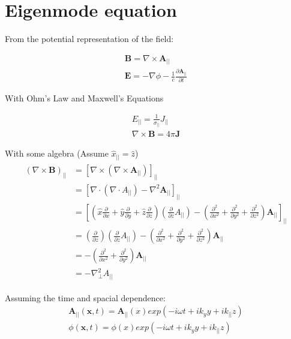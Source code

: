 \section{Eigenmode equation}
From the potential representation of the field:

\begin{equation}
    \begin{aligned}
    \textbf{B}=\nabla \times \textbf{A}_{||}\\
    \textbf{E}=-\nabla \phi -\frac{1}{c}\frac{\partial \textbf{A}_{||}}{\partial t}
    \end{aligned}
\end{equation}

With Ohm's Law and Maxwell's Equations

\begin{eqnarray}
    E_{||}=\frac{1}{\sigma_{||}}J_{||} \label{eq:ohm}\\
    \nabla \times \textbf{B} = 4\pi \textbf{J}
\end{eqnarray}

With some algebra (Assume $\hat{x}_{||}=\hat{z}$)
\begin{eqnarray}
\begin{aligned}
    (\nabla \times \textbf{B})_{||}{}&=[\nabla \times(\nabla \times \textbf{A}_{||}) ]_{||}\\
    &=[\nabla\cdot (\nabla\cdot A_{||}) - \nabla^2\textbf{A}_{||}]_{||}\\
    &=[(\hat{x}\frac{\partial }{\partial x}+
    \hat{y}\frac{\partial }{\partial y}+
    \hat{z}\frac{\partial }{\partial z}) (\frac{\partial }{\partial z} A_{||}) - (\frac{\partial^2 }{\partial x^2}+
    \frac{\partial^2 }{\partial y^2}+
    \frac{\partial^2 }{\partial z^2})\textbf{A}_{||}]_{||}\\
    &=(
   \frac{\partial }{\partial z}) (\frac{\partial }{\partial z} A_{||}) - (\frac{\partial^2 }{\partial x^2}+
    \frac{\partial^2 }{\partial y^2}+
    \frac{\partial^2 }{\partial z^2})\textbf{A}_{||}\\
    &=-(\frac{\partial^2 }{\partial x^2}+
    \frac{\partial^2 }{\partial y^2})\textbf{A}_{||}\\
    &=-\nabla_{\perp}^2 A_{||}
\end{aligned}
\end{eqnarray}

Assuming the time and spacial dependence: 
\begin{equation}
    \begin{aligned}
    \textbf{A}_{||}(\textbf{x},t)=\textbf{A}_{||}(x)exp(-i\omega t + ik_y y +ik_{||}z)\\
    \phi(\textbf{x},t)=\phi(x)exp(-i\omega t + ik_y y +ik_{||}z)
    \end{aligned}
\end{equation}

